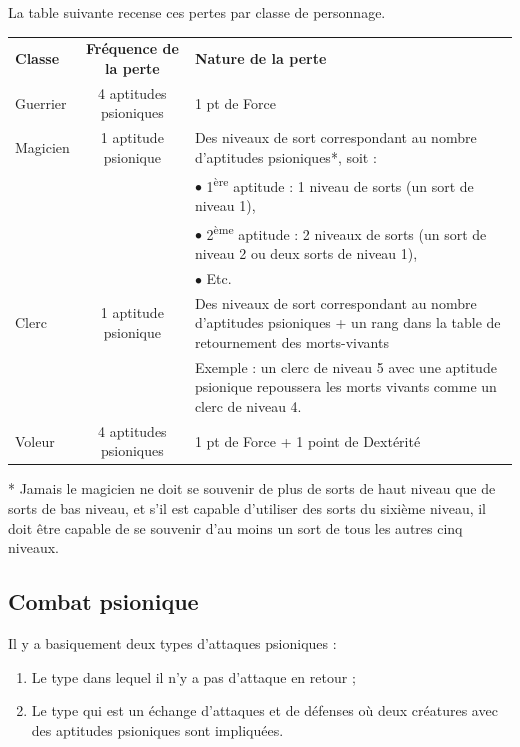 \documentclass[11pt]{article}
\begin{document}
{\bigskip

La table suivante recense ces pertes par classe de personnage.

\bigskip

\begin{tabular}{lcp{10cm}}
\textbf{Classe} & \textbf{Fréquence de la perte} & \textbf{Nature de la perte}\\
Guerrier & 4 aptitudes psioniques & 1 pt de Force \\
Magicien & 1 aptitude psionique & Des niveaux de sort correspondant au nombre d'aptitudes psioniques*, soit : \\
&& $\bullet$ 1\textsuperscript{ère} aptitude : 1 niveau de sorts (un sort de niveau 1), \\
&& $\bullet$ 2\textsuperscript{ème} aptitude : 2 niveaux de sorts (un sort de niveau 2 ou deux sorts de niveau 1), \\
&& $\bullet$ Etc. \\
Clerc & 1 aptitude psionique & Des niveaux de sort correspondant au nombre d'aptitudes psioniques + un rang dans la table de retournement des morts-vivants \\
&& Exemple : un clerc de niveau 5 avec une aptitude psionique repoussera les morts vivants comme un clerc de niveau 4. \\
Voleur & 4 aptitudes psioniques & 1 pt de Force + 1 point de Dextérité \\
\end{tabular}

\bigskip

* Jamais le magicien ne doit se souvenir de plus de sorts de haut niveau que de sorts de bas niveau, et s'il est capable d'utiliser des sorts du sixième niveau, il doit être capable de se souvenir d'au moins un sort de tous les autres cinq niveaux.

\bigskip

\subsection*{Combat psionique}

Il y a basiquement deux types d'attaques psioniques :

\bigskip

\begin{enumerate}
\item Le type dans lequel il n'y a pas d'attaque en retour ;
\item Le type qui est un échange d'attaques et de défenses où deux créatures avec des aptitudes psioniques sont impliquées.
\end{enumerate}

}
\end{document}
